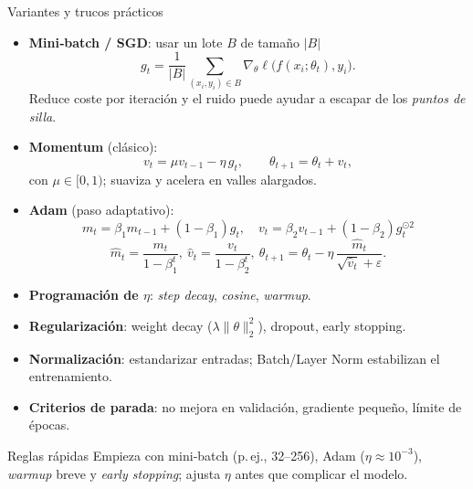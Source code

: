 \documentclass[10pt]{beamer}
\begin{document}
\begin{frame}{Variantes y trucos pr\'acticos}
\scriptsize
\begin{itemize}
  \item \textbf{Mini‐batch / SGD}: usar un lote $B$ de tama\~no $|B|$
  \[
    g_t=\frac{1}{|B|}\sum_{(x_i,y_i)\in B}\nabla_{\theta}\ell\!\big(f(x_i;\theta_t),y_i\big).
  \]
  Reduce coste por iteraci\'on y el ruido puede ayudar a escapar de los \emph{puntos de silla}.
  \item \textbf{Momentum} (cl\'asico):
  \[
    v_t=\mu v_{t-1}-\eta\,g_t,\qquad \theta_{t+1}=\theta_t+v_t,
  \]
  con $\mu\in[0,1)$; suaviza y acelera en valles alargados.
  \item \textbf{Adam} (paso adaptativo):
  \[
    m_t=\beta_1 m_{t-1}+(1-\beta_1)g_t,\quad
    v_t=\beta_2 v_{t-1}+(1-\beta_2)g_t^{\odot 2}
  \]
  \[
    \hat m_t=\frac{m_t}{1-\beta_1^t},\ \hat v_t=\frac{v_t}{1-\beta_2^t},\ 
    \theta_{t+1}=\theta_t-\eta\,\frac{\hat m_t}{\sqrt{\hat v_t}+\varepsilon}.
  \]
  \item \textbf{Programaci\'on de $\eta$}: \emph{step decay}, \emph{cosine}, \emph{warmup}.
  \item \textbf{Regularizaci\'on}: weight decay ($\lambda\lVert\theta\rVert_2^2$), dropout, early stopping.
  \item \textbf{Normalizaci\'on}: estandarizar entradas; Batch/Layer Norm estabilizan el entrenamiento.
  \item \textbf{Criterios de parada}: no mejora en validaci\'on, gradiente peque\~no, l\'imite de \'epocas.
\end{itemize}
\vspace{1mm}
\begin{block}{Reglas r\'apidas}
Empieza con mini‐batch (p.\,ej., 32–256), Adam ($\eta\!\approx\!10^{-3}$), \emph{warmup} breve y \emph{early stopping}; ajusta $\eta$ antes que complicar el modelo.
\end{block}
\end{frame}
\end{document}
